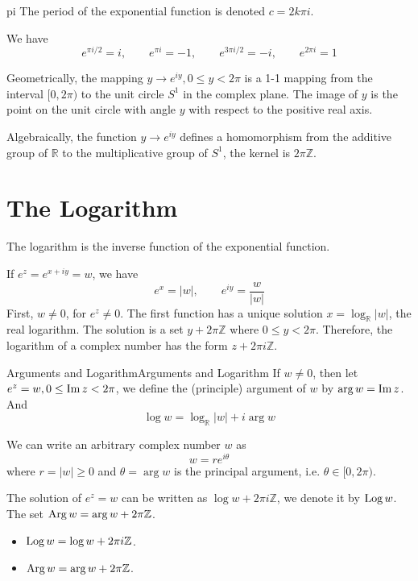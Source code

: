 \documentclass[../main.tex]{subfiles}
\begin{document}
\begin{definition}{\pi}{pi}
	The period of the exponential function is denoted $c = 2k \pi i$.
\end{definition}
We have
\begin{equation*}
	e^{\pi i / 2} = i, \qquad e^{\pi i} = -1, \qquad e^{3\pi i / 2} = -i, \qquad e^{2\pi i} = 1
\end{equation*}

Geometrically, the mapping $y \rightarrow e^{iy}, 0\leq y<2 \pi$ is a 1-1 mapping from the interval $[0,2\pi)$ to the unit circle $S^1$ in the complex plane. The image of $y$ is the point on the unit circle with angle $y$ with respect to the positive real axis.

Algebraically, the function $y \rightarrow e^{iy}$ defines a homomorphism from the additive group of $\mathbb{R}$ to the multiplicative group of $S^1$, the kernel is $2\pi \mathbb{Z}$.

\section{The Logarithm}

The logarithm is the inverse function of the exponential function.

If $e^z = e^{x+iy} = w$, we have
\begin{equation}
e^x = \left|w\right|, \qquad e^{iy} = \frac{w}{\left|w\right|}
\end{equation}
First, $w\neq 0$, for $e^z\neq 0$. The first function has a unique solution $x = \log_{\mathbb{R}} \left|w\right|$, the real logarithm. The solution is a set $y+2 \pi \mathbb{Z}$ where $0\leq y<2 \pi$. Therefore, the logarithm of a complex number has the form $z + 2 \pi i \mathbb{Z}$.

\begin{definition}{Arguments and Logarithm}{Arguments and Logarithm}
If $w\neq 0$, then let $e^z = w, 0\leq \operatorname{Im} z <2 \pi$, we define the (principle) argument of $w$ by $\arg w = \operatorname{Im} z$. And
\begin{equation}
\log w = \log_{\mathbb{R}} \left|w\right| + i \arg w
\end{equation}

We can write an arbitrary complex number $w$ as
\begin{equation}
w = r e^{i \theta}
\end{equation}
where $r = \left|w\right|\geq 0$ and $\theta = \arg w$ is the principal argument, i.e. $\theta \in [0,2\pi)$.
\end{definition}
The solution of $e^z=w$ can be written as $\log w + 2 \pi i \mathbb{Z}$, we denote it by $\operatorname{Log} w$. The set $\operatorname{Arg} w = \arg w + 2 \pi \mathbb{Z}$.
\begin{itemize}
\item $\operatorname{Log} w = \log w + 2 \pi i\mathbb{Z}$.
\item $\operatorname{Arg} w = \arg w + 2 \pi \mathbb{Z}$.
\end{itemize}
\end{document}
